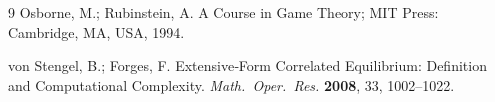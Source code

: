 \documentclass[11pt]{article}
\begin{document}
\begin{thebibliography}{9}
Osborne, M.; Rubinstein, A.
\newblock A Course in Game Theory; MIT Press: Cambridge, MA, USA, 1994.





von Stengel, B.; Forges, F.
\newblock Extensive‑Form Correlated Equilibrium: Definition and Computational Complexity.
\newblock \textit{Math.\ Oper.\ Res.} \textbf{2008}, 33, 1002--1022.

\end{thebibliography}
\end{document}
